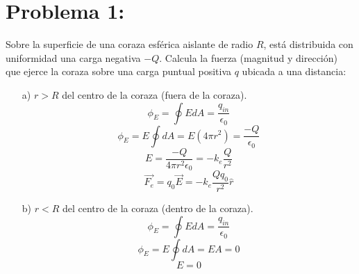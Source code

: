 \documentclass[12pt]{article}
\begin{document}
		\section{Problema 1:}\label{sec:Problema1}
			Sobre la superficie de una coraza esférica aislante de radio $ R $, está distribuida con
			uniformidad una carga negativa $ -Q $. Calcula la fuerza (magnitud y dirección) que
			ejerce la coraza sobre una carga puntual positiva $ q $ ubicada a una distancia:
			\begin{enumerate}
				\item[a)] $ r > R $ del centro de la coraza (fuera de la coraza).
						$$ \phi_E = \oint EdA = \frac{q_{in}}{\epsilon_0} $$
						$$ \phi_E = E \oint dA = E(4 \pi r^2) = \frac{-Q}{\epsilon_0} $$
						$$ E = \frac{-Q}{4 \pi r^2 \epsilon_0} = -k_e \frac{Q}{r^2} $$
						$$ \vec{F_e} = q_0 \vec{E} = -k_e \frac{Qq_0}{r^2} \hat{r} $$

				\item[b)] $ r < R $ del centro de la coraza (dentro de la coraza).
						$$ \phi_E = \oint EdA = \frac{q_{in}}{\epsilon_0} $$
						$$ \phi_E = E \oint dA = EA = 0 $$
						$$ E = 0 $$
			\end{enumerate}
\end{document}
